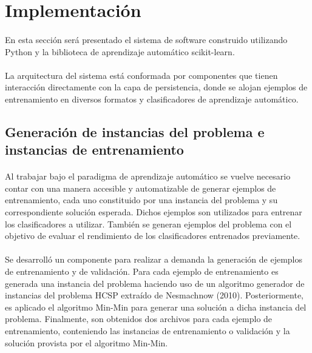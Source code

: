 \section{Implementación} \label{chapter-implementation}

\paragraph{} En esta sección será presentado el sistema de software construido utilizando Python y la biblioteca de aprendizaje automático scikit-learn.

\paragraph{} La arquitectura del sistema está conformada por componentes que tienen interacción directamente con la capa de persistencia, donde se alojan ejemplos de entrenamiento en diversos formatos y clasificadores de aprendizaje automático.

\subsection{Generación de instancias del problema e instancias de entrenamiento}

\paragraph{} Al trabajar bajo el paradigma de aprendizaje automático se vuelve necesario contar con una manera accesible y automatizable de generar ejemplos de entrenamiento, cada uno constituido por una instancia del problema y su correspondiente solución esperada. Dichos ejemplos son utilizados para entrenar los clasificadores a utilizar. También se generan ejemplos del problema con el objetivo de evaluar el rendimiento de los clasificadores entrenados previamente.

\paragraph{} Se desarrolló un componente para realizar a demanda la generación de ejemplos de entrenamiento y de validación. Para cada ejemplo de entrenamiento es generada una instancia del problema haciendo uso de un algoritmo generador de instancias del problema HCSP extraído de Nesmachnow (2010). Posteriormente, es aplicado el algoritmo Min-Min para generar una solución a dicha instancia del problema. Finalmente, son obtenidos dos archivos para cada ejemplo de entrenamiento, conteniendo las instancias de entrenamiento o validación y la solución provista por el algoritmo Min-Min.

